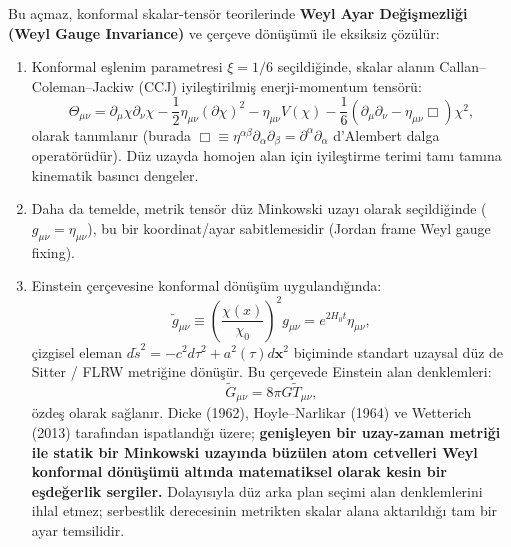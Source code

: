 \documentclass[11pt,a4paper]{article}
\begin{document}
Bu açmaz, konformal skalar-tensör teorilerinde \textbf{Weyl Ayar Değişmezliği (Weyl Gauge Invariance)} ve çerçeve dönüşümü ile eksiksiz çözülür:
\begin{enumerate}
    \item Konformal eşlenim parametresi $\xi = 1/6$ seçildiğinde, skalar alanın Callan--Coleman--Jackiw (CCJ) iyileştirilmiş enerji-momentum tensörü:
    \begin{equation}
        \Theta_{\mu\nu} = \partial_\mu\chi\partial_\nu\chi - \frac{1}{2}\eta_{\mu\nu}(\partial\chi)^2 - \eta_{\mu\nu}V(\chi) - \frac{1}{6}\left(\partial_\mu\partial_\nu - \eta_{\mu\nu}\Box\right)\chi^2,
        \label{eq:ccj_tensor}
    \end{equation}
    olarak tanımlanır (burada $\Box \equiv \eta^{\alpha\beta}\partial_\alpha\partial_\beta = \partial^\alpha\partial_\alpha$ d'Alembert dalga operatörüdür). Düz uzayda homojen alan için iyileştirme terimi tamı tamına kinematik basıncı dengeler.
    \item Daha da temelde, metrik tensör düz Minkowski uzayı olarak seçildiğinde ($g_{\mu\nu} = \eta_{\mu\nu}$), bu bir koordinat/ayar sabitlemesidir (Jordan frame Weyl gauge fixing).
    \item Einstein çerçevesine konformal dönüşüm uygulandığında:
    \begin{equation}
        \tilde{g}_{\mu\nu} \equiv \left(\frac{\chi(x)}{\chi_0}\right)^2 g_{\mu\nu} = e^{2H_0 t} \eta_{\mu\nu},
    \end{equation}
    çizgisel eleman $d\tilde{s}^2 = -c^2 d\tau^2 + a^2(\tau) d\mathbf{x}^2$ biçiminde standart uzaysal düz de Sitter / FLRW metriğine dönüşür. Bu çerçevede Einstein alan denklemleri:
    \begin{equation}
        \tilde{G}_{\mu\nu} = 8\pi G \tilde{T}_{\mu\nu},
    \end{equation}
    özdeş olarak sağlanır. Dicke (1962), Hoyle--Narlikar (1964) ve Wetterich (2013) tarafından ispatlandığı üzere; \textbf{genişleyen bir uzay-zaman metriği ile statik bir Minkowski uzayında büzülen atom cetvelleri Weyl konformal dönüşümü altında matematiksel olarak kesin bir eşdeğerlik sergiler.} Dolayısıyla düz arka plan seçimi alan denklemlerini ihlal etmez; serbestlik derecesinin metrikten skalar alana aktarıldığı tam bir ayar temsilidir.
\end{enumerate}
\end{document}
